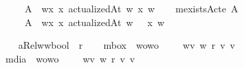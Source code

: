 \begin{isabellebody}
\isanewline
\ \ \ \ \ {\isachardoublequoteopen}\isactrlbold {\isasymforall}\isactrlsup A{\isasymPhi}\ {\isasymequiv}\ {\isasymlambda}w{\isachardot}{\isasymforall}x{\isachardot}\ {\isacharparenleft}x\ actualizedAt\ w{\isacharparenright}{\isasymlongrightarrow}{\isacharparenleft}{\isasymPhi}\ x\ w{\isacharparenright}{\isachardoublequoteclose}\isanewline
\ \ \isamarkupfalse%
\ mexistsAct{\isacharcolon}{\isacharcolon}{\isachardoublequoteopen}{\isasymup}{\isasymlangle}{\isasymup}{\isasymlangle}e{\isasymrangle}{\isasymrangle}{\isachardoublequoteclose}\ {\isacharparenleft}{\isachardoublequoteopen}\isactrlbold {\isasymexists}\isactrlsup A{\isachardoublequoteclose}{\isacharparenright}\isanewline
\ \ \ \ \ {\isachardoublequoteopen}\isactrlbold {\isasymexists}\isactrlsup A{\isasymPhi}\ {\isasymequiv}\ {\isasymlambda}w{\isachardot}{\isasymexists}x{\isachardot}\ {\isacharparenleft}x\ actualizedAt\ w{\isacharparenright}\ {\isasymand}\ {\isacharparenleft}{\isasymPhi}\ x\ w{\isacharparenright}{\isachardoublequoteclose}%
\begin{isamarkuptext}%
%
\end{isamarkuptext}\isamarkuptrue%
\ \ \isamarkupfalse%
\ aRel{\isacharcolon}{\isacharcolon}{\isachardoublequoteopen}w{\isasymRightarrow}w{\isasymRightarrow}bool{\isachardoublequoteclose}\ {\isacharparenleft}\ {\isachardoublequoteopen}r{\isachardoublequoteclose}{\isacharparenright}\isanewline
\ \ \isamarkupfalse%
\ mbox\ {\isacharcolon}{\isacharcolon}\ {\isachardoublequoteopen}wo{\isasymRightarrow}wo{\isachardoublequoteclose}\ {\isacharparenleft}{\isachardoublequoteopen}\isactrlbold {\isasymbox}{\isacharunderscore}{\isachardoublequoteclose}{\isacharparenright}\ \ {\isachardoublequoteopen}\isactrlbold {\isasymbox}{\isasymphi}\ {\isasymequiv}\ {\isasymlambda}w{\isachardot}{\isasymforall}v{\isachardot}\ {\isacharparenleft}w\ r\ v{\isacharparenright}{\isasymlongrightarrow}{\isacharparenleft}{\isasymphi}\ v{\isacharparenright}{\isachardoublequoteclose}\isanewline
\ \ \isamarkupfalse%
\ mdia\ {\isacharcolon}{\isacharcolon}\ {\isachardoublequoteopen}wo{\isasymRightarrow}wo{\isachardoublequoteclose}\ {\isacharparenleft}{\isachardoublequoteopen}\isactrlbold {\isasymdiamond}{\isacharunderscore}{\isachardoublequoteclose}{\isacharparenright}\ \ {\isachardoublequoteopen}\isactrlbold {\isasymdiamond}{\isasymphi}\ {\isasymequiv}\ {\isasymlambda}w{\isachardot}{\isasymexists}v{\isachardot}\ {\isacharparenleft}w\ r\ v{\isacharparenright}{\isasymand}{\isacharparenleft}{\isasymphi}\ v{\isacharparenright}{\isachardoublequoteclose}\isanewline

\end{isabellebody}
